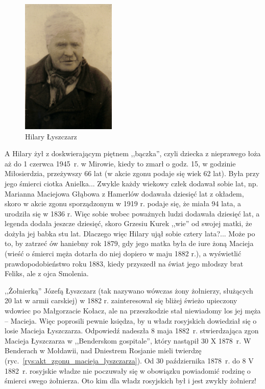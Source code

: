 \begin{figure}[!h]
\begin{center}
\includegraphics[width=0.4\textwidth]{zdjecia/hilary_lyszczarz.jpg}
\caption{Hilary Łyszczarz}
\label{rys:hilary_lyszczarz}
\end{center}
\end{figure}

A Hilary żył z doskwierającym piętnem ,,bączka'', czyli dziecka z nieprawego łoża aż do 1 czerwca 1945~r. w Mirowie, kiedy to zmarł o godz. 15, w godzinie Miłosierdzia, przeżywszy 66 lat (w akcie zgonu podaje się wiek 62 lat). Była przy jego śmierci ciotka Anielka... Zwykle każdy wiekowy człek dodawał sobie lat, np. Marianna Maciejowa Głąbowa z Hamerlów dodawała dziesięć lat z okładem, skoro w akcie zgonu sporządzonym w 1919 r. podaje się, że miała 94 lata, a urodziła się w 1836 r. Więc sobie  wobec poważnych ludzi dodawała dziesięć lat, a legenda dodała jeszcze dziesięć, skoro Grzesiu Kurek ,,wie'' od swojej matki, że dożyła jej babka stu lat. Dlaczego więc Hilary ujął sobie cztery lata?... Może po to, by zatrzeć ów haniebny rok 1879, gdy jego matka była de iure żoną Macieja (wieść o śmierci męża dotarła do niej dopiero w maju 1882 r.), a wyświetlić prawdopodobieństwo roku 1883, kiedy przyszedł na świat jego młodszy brat Feliks, ale z ojca Smolenia.

,,Żołnierką'' Józefą Łyszczarz (tak nazywano wówczas żony żołnierzy, służących 20 lat w armii carskiej) w 1882 r. zainteresował się bliżej  świeżo upieczony wdowiec po Małgorzacie Kołacz, ale na przeszkodzie stał niewiadomy los jej męża -- Macieja. Więc poprosili pewnie księdza, by u władz rosyjskich dowiedział się o losie Macieja Łyszczarza. Odpowiedź nadeszła 8 maja 1882~r. stwierdzająca zgon Macieja Łyszczarza w ,,Benderskom gospitale'', który nastąpił 30 X 1878~r. W Benderach w Mołdawii, nad Dniestrem Rosjanie mieli twierdzę (ryc.~\ref{rys:akt_zgonu_macieja_lyszczarza}). Od 30 października 1878~r. do 8 V 1882~r. rosyjskie władze nie poczuwały się w obowiązku powiadomić rodzinę o śmierci swego żołnierza. Oto kim dla władz rosyjskich był i jest zwykły żołnierz!


